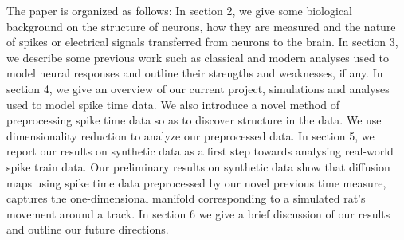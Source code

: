 The  paper is organized as follows: In section 2, we give some biological background on the structure of neurons,
how they are measured and the nature of spikes or electrical signals transferred from neurons to the brain. 
In section 3, we describe some previous work such as classical and modern analyses used to model neural responses
and outline their strengths and weaknesses, if any. In section 4, we give an overview of our current project, simulations and analyses used to model spike time data.  We also introduce a novel method of preprocessing spike time data so as to discover structure in the data. We use dimensionality reduction to analyze our preprocessed data.  In section 5, we report our results on synthetic data as a first step towards analysing real-world spike train data. Our preliminary results on synthetic data show that diffusion maps using spike time data preprocessed by our novel previous time measure,
captures the  one-dimensional manifold corresponding to a simulated rat's movement around a track. In section 6 we give a brief discussion of our results and outline our future directions.
 
 
 
 
 
 
 
 
 
 
 
 
 
 
 
 
 
 
 
 
 
 
 




